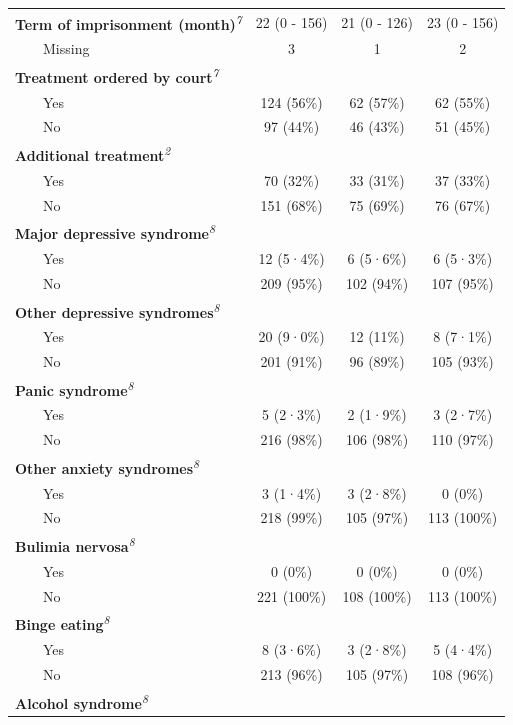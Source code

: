 \documentclass[
  super,
  preprint,
  1p,
  onecolumn]{elsarticle}
\begin{document}
\begin{table}
{\begin{tabular*}{\linewidth}{@{\extracolsep{\fill}}lccc}
{\bfseries Term of imprisonment (month)}\textsuperscript{\textit{7}} & 22 (0 - 156) & 21 (0 - 126) & 23 (0 - 156) \\ 
    Missing & 3 & 1 & 2 \\ 
{\bfseries Treatment ordered by court}\textsuperscript{\textit{7}} &  &  &  \\ 
    Yes & 124 (56\%) & 62 (57\%) & 62 (55\%) \\ 
    No & 97 (44\%) & 46 (43\%) & 51 (45\%) \\ 
{\bfseries Additional treatment}\textsuperscript{\textit{2}} &  &  &  \\ 
    Yes & 70 (32\%) & 33 (31\%) & 37 (33\%) \\ 
    No & 151 (68\%) & 75 (69\%) & 76 (67\%) \\ 
{\bfseries Major depressive syndrome}\textsuperscript{\textit{8}} &  &  &  \\ 
    Yes & 12 (5·4\%) & 6 (5·6\%) & 6 (5·3\%) \\ 
    No & 209 (95\%) & 102 (94\%) & 107 (95\%) \\ 
{\bfseries Other depressive syndromes}\textsuperscript{\textit{8}} &  &  &  \\ 
    Yes & 20 (9·0\%) & 12 (11\%) & 8 (7·1\%) \\ 
    No & 201 (91\%) & 96 (89\%) & 105 (93\%) \\ 
{\bfseries Panic syndrome}\textsuperscript{\textit{8}} &  &  &  \\ 
    Yes & 5 (2·3\%) & 2 (1·9\%) & 3 (2·7\%) \\ 
    No & 216 (98\%) & 106 (98\%) & 110 (97\%) \\ 
{\bfseries Other anxiety syndromes}\textsuperscript{\textit{8}} &  &  &  \\ 
    Yes & 3 (1·4\%) & 3 (2·8\%) & 0 (0\%) \\ 
    No & 218 (99\%) & 105 (97\%) & 113 (100\%) \\ 
{\bfseries Bulimia nervosa}\textsuperscript{\textit{8}} &  &  &  \\ 
    Yes & 0 (0\%) & 0 (0\%) & 0 (0\%) \\ 
    No & 221 (100\%) & 108 (100\%) & 113 (100\%) \\ 
{\bfseries Binge eating}\textsuperscript{\textit{8}} &  &  &  \\ 
    Yes & 8 (3·6\%) & 3 (2·8\%) & 5 (4·4\%) \\ 
    No & 213 (96\%) & 105 (97\%) & 108 (96\%) \\ 
{\bfseries Alcohol syndrome}\textsuperscript{\textit{8}} &  &  &  \\ 

\end{tabular*}}
\end{table}
\end{document}
